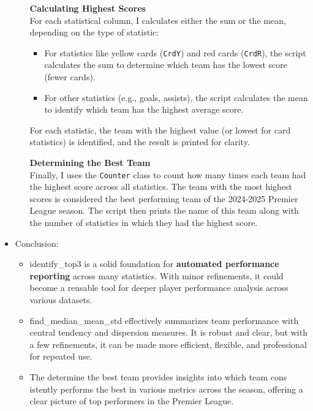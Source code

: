 \documentclass[a4paper,12pt]{article}
\begin{document}
\begin{itemize}[label= {*}, leftmargin= 1cm]
\begin{itemize}[label= {}, leftmargin= 1cm]
        \textbf{Calculating Highest Scores}\\
        For each statistical column, I calculates either the sum or the mean, depending on the type of statistic:
        \begin{itemize}
            \item For statistics like yellow cards (\texttt{CrdY}) and red cards (\texttt{CrdR}), the script calculates the sum to determine which team has the lowest score (fewer cards).
            \item For other statistics (e.g., goals, assists), the script calculates the mean to identify which team has the highest average score.
        \end{itemize}
        For each statistic, the team with the highest value (or lowest for card statistics) is identified, and the result is printed for clarity.
        \vspace{0.3cm}
        
        \textbf{Determining the Best Team}\\
        Finally, I uses the \texttt{Counter} class to count how many times each team had the highest score across all statistics. The team with the most highest scores is considered the best performing team of the 2024-2025 Premier League season. The script then prints the name of this team along with the number of statistics in which they had the highest score.
        
        
    \end{itemize}
    \item {\Large Conclusion:}
    \begin{itemize}[label= {-}, leftmargin= 1cm]
        \item identify\_top3 is a solid foundation for \textbf{automated performance reporting} across many statistics. With minor refinements, it could become a reusable tool for deeper player performance analysis across various datasets.
        \item find\_median\_mean\_std effectively summarizes team performance with central tendency and dispersion measures. It is robust and clear, but with a few refinements, it can be made more efficient, flexible, and professional for repeated use.
        \item The determine the best team provides insights into which team cons istently performs the best in various metrics across the season, offering a clear picture of top performers in the Premier League.
    \end{itemize}
    \newpage


\end{itemize}
\end{document}
